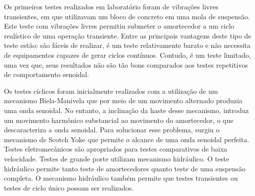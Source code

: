 		Os primeiros testes realizados em laboratório foram de vibrações livres transientes, em que utilizavam um bloco de concreto em uma mola de suspensão. Este teste com vibrações livres permitiu submeter o amortecedor a um ciclo realístico de uma operação transiente. Entre as principais vantagens deste tipo de teste estão: são fáceis de realizar, é um teste relativamente barato e não necessita de equipamentos capazes de gerar ciclos contínuos. Contudo, é um teste limitado, uma vez que, seus resultados não são tão bons comparados aos testes repetitivos de comportamento senoidal. 
	 
		Os testes cíclicos foram inicialmente realizados com a utilização de um mecanismo Biela-Manivela que por meio de um movimento alternado produzia uma onda senoidal. No entanto, a inclinação da haste desse mecanismo, introduz um movimento harmônico substancial ao movimento do amortecedor, o que descaracteriza a onda senoidal. Para solucionar esse problema, surgiu o mecanismo de Scotch Yoke que permite o alcance de uma onda senoidal perfeita. Testes eletromecânicos são apropriados para testes comparativos de baixa velocidade. Testes de grande porte utilizam mecanismo hidráulico. O teste hidráulico permite tanto teste de amortecedores quanto teste de uma suspensão completa. O mecanismo hidráulico também permite que testes transientes ou testes de ciclo único possam ser realizados. 
